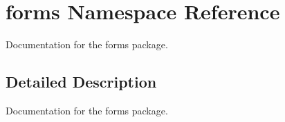 \hypertarget{namespaceforms}{}\section{forms Namespace Reference}
\label{namespaceforms}


Documentation for the forms package.  




\subsection{Detailed Description}
Documentation for the forms package. 
